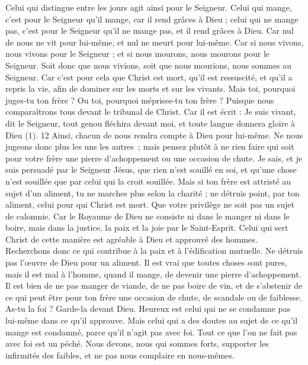 \begin{multicols}{2}
Celui qui distingue entre les jours agit ainsi pour le Seigneur. Celui qui mange, c’est pour le Seigneur qu’il mange, car il rend grâces à Dieu ; celui qui ne mange pas, c’est pour le Seigneur qu’il ne mange pas, et il rend grâces à Dieu.
Car nul de nous ne vit pour lui-même, et nul ne meurt pour lui-même.
Car si nous vivons, nous vivons pour le Seigneur ; et si nous mourons, nous mourons pour le Seigneur. Soit donc que nous vivions, soit que nous mourions, nous sommes au Seigneur.
Car c'est pour cela que Christ est mort, qu'il est ressuscité, et qu'il a repris la vie, afin de dominer sur les morts et sur les vivants.
Mais toi, pourquoi juges-tu ton frère ? Ou toi, pourquoi méprises-tu ton frère ? Puisque nous comparaîtrons tous devant le tribunal de Christ.
Car il est écrit : Je suis vivant, dit le Seigneur, tout genou fléchira devant moi, et toute langue donnera gloire à Dieu (1). 12 Ainsi, chacun de nous rendra compte à Dieu pour lui-même.
Ne nous jugeons donc plus les uns les autres ; mais pensez plutôt à ne rien faire qui soit pour votre frère une pierre d’achoppement ou une occasion de chute.
Je sais, et je suis persuadé par le Seigneur Jésus, que rien n'est souillé en soi, et qu’une chose n’est souillée que par celui qui la croit souillée.
Mais si ton frère est attristé au sujet d’un aliment, tu ne marches plus selon la charité ; ne détruis point, par ton aliment, celui pour qui Christ est mort.
Que votre privilège ne soit pas un sujet de calomnie.
Car le Royaume de Dieu ne consiste ni dans le manger ni dans le boire, mais dans la justice, la paix et la joie par le Saint-Esprit.
Celui qui sert Christ de cette manière est agréable à Dieu et approuvé des hommes.
Recherchons donc ce qui contribue à la paix et à l’édification mutuelle.
Ne détruis pas l’œuvre de Dieu pour un aliment. Il est vrai que toutes choses sont pures, mais il est mal à l’homme, quand il mange, de devenir une pierre d’achoppement.
Il est bien de ne pas manger de viande, de ne pas boire de vin, et de s’abstenir de ce qui peut être pour ton frère une occasion de chute, de scandale ou de faiblesse.
As-tu la foi ? Garde-la devant Dieu. Heureux est celui qui ne se condamne pas lui-même dans ce qu'il approuve.
Mais celui qui a des doutes au sujet de ce qu’il mange est condamné, parce qu’il n’agit pas avec foi. Tout ce que l’on ne fait pas avec foi est un péché.
\VerseOne{}Nous devons, nous qui sommes forts, supporter les infirmités des faibles, et ne pas nous complaire en nous-mêmes.

\end{multicols}

